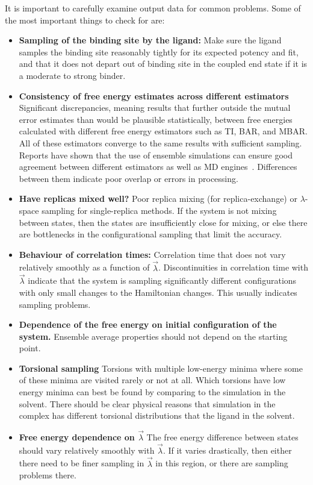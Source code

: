 \documentclass[9pt,bestpractices]{livecoms}
\begin{document}
It is important to carefully examine output data for common problems. Some of the most important things to check for are:
\begin{itemize}
\item \textbf{Sampling of the binding site by the ligand:} Make sure the ligand samples the binding site reasonably tightly for its expected potency and fit, and that it does not depart out of binding site in the coupled end state if it is a moderate to strong binder. 
\item \textbf{Consistency of free energy estimates across different estimators} Significant discrepancies, meaning results that further outside the mutual error estimates than would be plausible statistically, between free energies calculated with different free energy estimators such as TI, BAR, and MBAR. All of these estimators converge to the same results with sufficient sampling. Reports have shown that the use of ensemble simulations can ensure good agreement between different estimators as well as MD engines~\cite{wade2022}. Differences between them indicate poor overlap or errors in processing.
\item \textbf{Have replicas mixed well?} Poor replica mixing (for replica-exchange) or $\lambda$-space sampling for single-replica methods. If the system is not mixing between states, then the states are insufficiently close for mixing, or else there are bottlenecks in the configurational sampling that limit the accuracy.
\item \textbf{Behaviour of correlation times:} Correlation time that does not vary relatively smoothly as a function of $\vec{\lambda}$. Discontinuities in correlation time with $\vec{\lambda}$ indicate that the system is sampling significantly different configurations with only small changes to the Hamiltonian changes. This usually indicates sampling problems.
\item \textbf{Dependence of the free energy on initial configuration of the system.} Ensemble average properties should not depend on the starting point.
\item \textbf{Torsional sampling} Torsions with multiple low-energy minima where some of these minima are visited rarely or not at all. Which torsions have low energy minima can best be found by comparing to the simulation in the solvent. There should be clear physical reasons that simulation in the complex has different torsional distributions that the ligand in the solvent. 
\item \textbf{Free energy dependence on $\vec{\lambda}$} The free energy difference between states should vary relatively smoothly with $\vec{\lambda}$. If it varies drastically, then either there need to be finer sampling in $\vec{\lambda}$ in this region, or there are sampling problems there.

\end{itemize}
\end{document}
